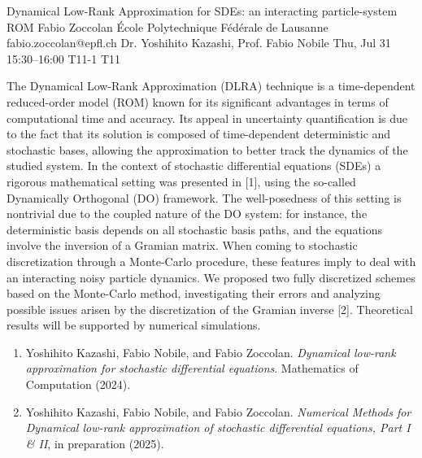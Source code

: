 \documentclass[12pt,lettersize,oneside]{book} %
\begin{document}
\begin{talk}
  {Dynamical Low-Rank Approximation for SDEs: an interacting particle-system ROM}%
  {Fabio Zoccolan}%
  {\'Ecole Polytechnique F\'ed\'erale de Lausanne}%
  {fabio.zoccolan@epfl.ch}%
  {Dr. Yoshihito Kazashi, Prof. Fabio Nobile}%
  {}%
  {Thu, Jul 31 15:30--16:00}%
  {T11-1}%
  {T11}%
  
The Dynamical Low-Rank Approximation (DLRA) technique is a time-dependent reduced-order model (ROM) known for its significant advantages in terms of computational time and accuracy. Its appeal in uncertainty quantification is due to the fact that its solution is composed of time-dependent deterministic and stochastic bases, allowing the approximation to better track the dynamics of the studied system. In the context of stochastic differential equations (SDEs) a rigorous mathematical setting was presented in [1], using the so-called Dynamically Orthogonal (DO) framework. The well-posedness of this setting is nontrivial due to the coupled nature of the DO system: for instance, the deterministic basis depends on all stochastic basis paths, and the equations involve the inversion of a Gramian matrix. When coming to stochastic discretization through a Monte-Carlo procedure, these features imply to deal with an interacting noisy particle dynamics. We proposed two fully discretized schemes based on the Monte-Carlo method, investigating their errors and analyzing possible issues arisen by the discretization of the Gramian inverse [2]. Theoretical results will be supported by numerical simulations.

\medskip
\begin{enumerate}
 \item[{[1]}] Yoshihito Kazashi, Fabio Nobile, and Fabio Zoccolan. {\it Dynamical low-rank approximation for stochastic differential equations}. Mathematics of Computation (2024).
 \item[{[2]}] Yoshihito Kazashi, Fabio Nobile, and Fabio Zoccolan. {\it Numerical Methods for Dynamical low-rank approximation of stochastic differential equations, Part I \& II}, in preparation (2025).
\end{enumerate}

\end{talk}
\end{document}
